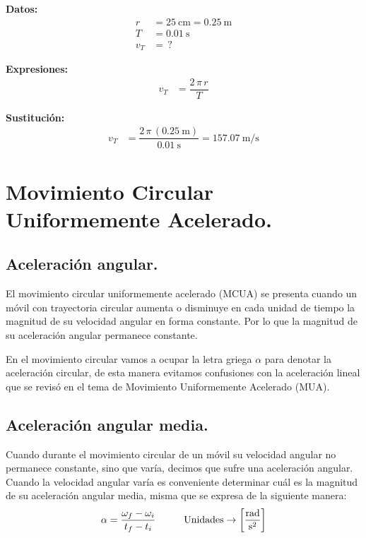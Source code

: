 \documentclass[14pt]{extarticle}
\begin{document}
\begin{enumerate}
\vspace*{0.5cm}
\begin{minipage}[t]{0.4\linewidth}
\textbf{Datos:}
\begin{align*}
r &= \SI{25}{\centi\meter} = \SI{0.25}{\meter} \\
T &= \SI{0.01}{\second} \\
v_{T} &= \, ?
\end{align*}
\end{minipage}
\begin{minipage}[t]{0.4\linewidth}
\textbf{Expresiones:}
\begin{align*}
v_{T} &= \dfrac{2 \, \pi \, r }{T}
\end{align*}
\end{minipage}

\textbf{Sustitución:}
\begin{align*}
v_{T} &= \dfrac{2 \, \pi \, \left( \SI{0.25}{\meter} \right)}{\SI{0.01}{\second}}= \SI[per-mode=fraction]{157.07}{\meter\per\second}
\end{align*}
\end{enumerate}

\section{Movimiento Circular Uniformemente Acelerado.}
\subsection{Aceleración angular.}

El movimiento circular uniformemente acelerado (MCUA) se presenta cuando un móvil con trayectoria circular aumenta o disminuye en cada unidad de tiempo la magnitud de su velocidad angular en forma constante. Por lo que la magnitud de su aceleración angular permanece constante.

En el movimiento circular vamos a ocupar la letra griega $\alpha$ para denotar la aceleración circular, de esta manera evitamos confusiones con la aceleración lineal que se revisó en el tema de Movimiento Uniformemente Acelerado (MUA).

\subsection{Aceleración angular media.}

Cuando durante el movimiento circular de un móvil su velocidad angular no permanece constante, sino que varía, decimos que sufre una aceleración angular. Cuando la velocidad angular varía es conveniente determinar cuál es la magnitud de su aceleración angular media, misma que se expresa de la siguiente manera:
\begin{align*}
\alpha = \dfrac{\omega_{f} - \omega_{i}}{t_{f} - t_{i}} \hspace{1cm} \text{Unidades} \rightarrow \left[ \unit[per-mode=fraction]{\radian\per\square\second} \right]
\end{align*}
\end{document}

